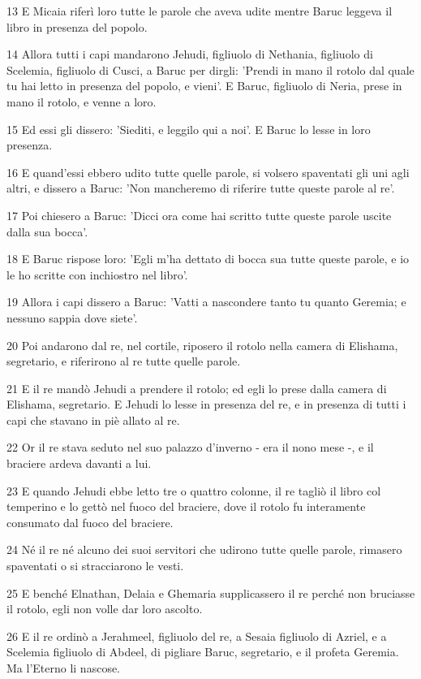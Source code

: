 \par 13 E Micaia riferì loro tutte le parole che aveva udite mentre Baruc leggeva il libro in presenza del popolo.
\par 14 Allora tutti i capi mandarono Jehudi, figliuolo di Nethania, figliuolo di Scelemia, figliuolo di Cusci, a Baruc per dirgli: 'Prendi in mano il rotolo dal quale tu hai letto in presenza del popolo, e vieni'. E Baruc, figliuolo di Neria, prese in mano il rotolo, e venne a loro.
\par 15 Ed essi gli dissero: 'Siediti, e leggilo qui a noi'. E Baruc lo lesse in loro presenza.
\par 16 E quand'essi ebbero udito tutte quelle parole, si volsero spaventati gli uni agli altri, e dissero a Baruc: 'Non mancheremo di riferire tutte queste parole al re'.
\par 17 Poi chiesero a Baruc: 'Dicci ora come hai scritto tutte queste parole uscite dalla sua bocca'.
\par 18 E Baruc rispose loro: 'Egli m'ha dettato di bocca sua tutte queste parole, e io le ho scritte con inchiostro nel libro'.
\par 19 Allora i capi dissero a Baruc: 'Vatti a nascondere tanto tu quanto Geremia; e nessuno sappia dove siete'.
\par 20 Poi andarono dal re, nel cortile, riposero il rotolo nella camera di Elishama, segretario, e riferirono al re tutte quelle parole.
\par 21 E il re mandò Jehudi a prendere il rotolo; ed egli lo prese dalla camera di Elishama, segretario. E Jehudi lo lesse in presenza del re, e in presenza di tutti i capi che stavano in piè allato al re.
\par 22 Or il re stava seduto nel suo palazzo d'inverno - era il nono mese -, e il braciere ardeva davanti a lui.
\par 23 E quando Jehudi ebbe letto tre o quattro colonne, il re tagliò il libro col temperino e lo gettò nel fuoco del braciere, dove il rotolo fu interamente consumato dal fuoco del braciere.
\par 24 Né il re né alcuno dei suoi servitori che udirono tutte quelle parole, rimasero spaventati o si stracciarono le vesti.
\par 25 E benché Elnathan, Delaia e Ghemaria supplicassero il re perché non bruciasse il rotolo, egli non volle dar loro ascolto.
\par 26 E il re ordinò a Jerahmeel, figliuolo del re, a Sesaia figliuolo di Azriel, e a Scelemia figliuolo di Abdeel, di pigliare Baruc, segretario, e il profeta Geremia. Ma l'Eterno li nascose.
